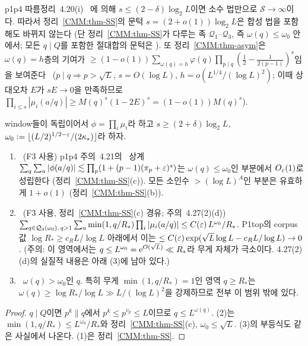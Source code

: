 \begin{remark}\label{CMM:rem-threshold}
p1p4 따름정리~4.20(i) \PROVED\ 에 의해 $s\le(2-\delta)\log_2L$이면 소수 법만으로 $\mathcal S\to\infty$이다. 따라서 정리~\ref{CMM:thm-SS}의
문턱 $s=(2+o(1))\log_2L$은 합성 법을 포함해도 바뀌지 않는다
(단 정리~\ref{CMM:thm-SS}가 다루는 족 $\mathcal Q_1$--$\mathcal Q_3$, 즉 $\omega(q)\le\omega_0$ 안에서; 모든 $q\mid Q$를 포함한 절대합의 문턱은 \OPEN).
또 정리~\ref{CMM:thm-asym}은 $\omega(q)=h$층의 기여가
$\ge(1-o(1))\sum_{\omega(q)=h}\varphi(q)\prod_{p\mid q}(\frac12-\frac1{2(p-1)})^{s}$임을 보여준다 \PROVED\
($p\mid q\Rightarrow p>\sqrt L$, $s=O(\log L)$, $h=o(L^{1/4}/(\log L)^2)$; 이때 상대오차 $E$가 $sE\to0$을 만족하므로
$\prod_{i\le s}|\mu_i(a/q)|\ge M(q)^s(1-2E)^s=(1-o(1))M(q)^s$).
\end{remark}

\begin{corollary}[p1p4 주의~4.21, 4.27(2)(d)의 격상]\label{CMM:cor-upgrade}
window들이 독립이어서 $\phi=\prod_i\mu_i$라 하고 $s\ge(2+\delta)\log_2L$, $\omega_0:=\lfloor(L/2)^{1/2-\varepsilon}/(2\kappa_*)\rfloor$라 하자.
\begin{enumerate}[label=(\arabic*)]
\item \PROVED\ (F3 사용) p1p4 주의~4.21의 \HEUR\ 상계 $\sum_{q}\sum_a|\phi(a/q)|\lesssim\prod_p(1+(p-1)(\pi_p+\varepsilon)^s)$는
 $\omega(q)\le\omega_0$인 부분에서 $O_\varepsilon(1)$로 성립한다 (정리~\ref{CMM:thm-SS}(c)). 모든 소인수 $>(\log L)^A$인 부분은 유효하게 $1+o(1)$ (정리~\ref{CMM:thm-SS}(b)).
\item \PROVED\ (F3 사용, 정리~\ref{CMM:thm-SS}(c) 경유; 주의~4.27(2)(d)) $\sum_{q\in\mathcal Q_3(\omega_0),\,q>1}\sum_a\min(1,q/R_*)\prod_i|\mu_i(a/q)|\le C(\varepsilon)\,L^{\omega_0}/R_*$.
 P1top의 corpus 값 $\log R_*\ge c_RL/\log L$ 아래에서 이는 $\le C(\varepsilon)\exp(\sqrt L\log L-c_RL/\log L)\to0$.
 (주의: 이 영역에서는 $q\le L^{\omega_0}=\mathrm{e}^{O(\sqrt L)}\ll R_*$라 무게 자체가 극소이다. 4.27(2)(d)의 실질적 내용은 아래 (3)에 남아 있다.)
\item \OPEN\ $\omega(q)>\omega_0$인 $q$. 특히 무게 $\min(1,q/R_*)=1$인 영역 $q\ge R_*$는 $\omega(q)\ge\log R_*/\log L\gg L/(\log L)^2$을 강제하므로 전부 이 범위 밖에 있다.
\end{enumerate}
\end{corollary}
\begin{proof}
$q\mid Q$이면 $p^k\|q$에서 $p^k\le p^{v_p}\le L$이므로 $q\le L^{\omega(q)}$. (2)는 $\min(1,q/R_*)\le L^{\omega_0}/R_*$와 정리~\ref{CMM:thm-SS}(c),
$\omega_0\le\sqrt L$. (3)의 부등식도 같은 사실에서 나온다. (1)은 정리~\ref{CMM:thm-SS}.
\end{proof}


